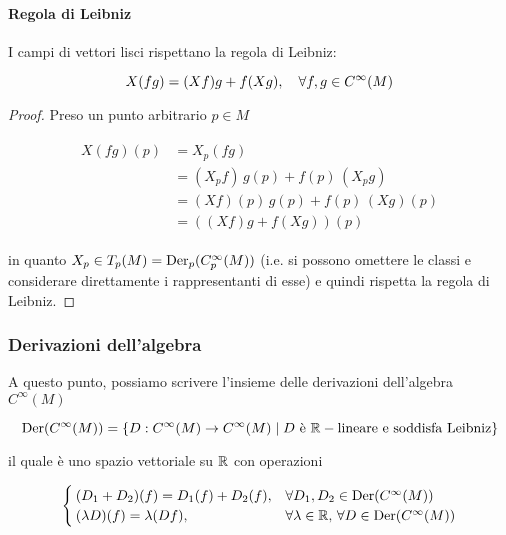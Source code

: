\paragraph{Regola di Leibniz}

I campi di vettori lisci rispettano la regola di Leibniz:

\begin{equation}
	X(f g) = (X f) g + f (X g) \qcomma \forall f,g \in C^{\infty}(M)
\end{equation}

\begin{proof}
	Preso un punto arbitrario $ p \in M $
	
	\begin{align}
		\begin{split}
			X(f g)(p) &= X_{p}(f g)\\
			&= (X_{p} f) \, g(p) + f(p) \, (X_{p} g)\\
			&= (X f)(p) \, g(p) + f(p) \, (X g)(p)\\
			&= ((X f) g + f (X g))(p)
		\end{split}
	\end{align}
	
	in quanto $ X_{p} \in T_{p}(M) = \operatorname{Der}_{p}(C_{p}^{\infty}(M)) $ (i.e. si possono omettere le classi e considerare direttamente i rappresentanti di esse) e quindi rispetta la regola di Leibniz.
\end{proof}

\subsubsection{Derivazioni dell'algebra}

A questo punto, possiamo scrivere l'insieme delle derivazioni dell'algebra $ C^{\infty}(M) $

\begin{equation}
	\operatorname{Der}(C^{\infty}(M)) = \{ D : C^{\infty}(M) \to C^{\infty}(M) \mid D \text{ è } \mathbb{R}-\text{lineare e soddisfa Leibniz} \}
\end{equation}

il quale è uno spazio vettoriale su $ \mathbb{R} $ con operazioni

\begin{equation}
	\begin{cases}
		(D_{1} + D_{2})(f) = D_{1}(f) + D_{2}(f), & \forall D_{1},D_{2} \in \operatorname{Der}(C^{\infty}(M)) \\
		(\lambda D)(f) = \lambda (D f), & \forall \lambda \in \mathbb{R}, \, \forall D \in \operatorname{Der}(C^{\infty}(M))
	\end{cases}
\end{equation}

